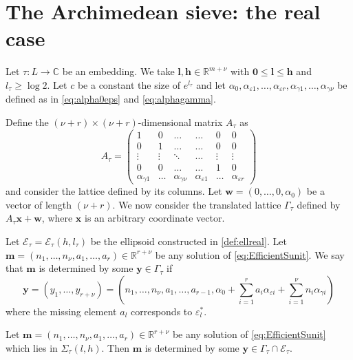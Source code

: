 \section{The Archimedean sieve: the real case}
\label{sec:archsieve}

Let $\tau:L\to\mathbb{C}$ be an embedding. We take $\mathbf{l},\mathbf{h} \in \mathbb{R}^{m+\nu}$ with $\mathbf{0}\leq \mathbf{l}\leq \mathbf{h}$ and $l_\tau\geq \log 2$. Let $c$ be a constant the size of $e^{l_\tau}$ and let $\alpha_0, \alpha_{\varepsilon 1}, \dots, \alpha_{\varepsilon {r}}, \alpha_{\gamma 1}, \dots, \alpha_{\gamma {\nu}}$ be defined as in \eqref{eq:alpha0eps} and \eqref{eq:alphagamma}. 

Define the $(\nu+r) \times (\nu +r)$-dimensional matrix $A_{\tau}$ as
\[A_{\tau} = \begin{pmatrix}
	1 & 0 & \dots &  \dots & 0 & 0\\ 
	0 & 1	& \dots & \dots & 0 & 0\\
	\vdots & \vdots & \ddots & \dots & \vdots & \vdots \\ 
	0 & 0 & \dots &  \dots & 1 & 0\\ 
	\alpha_{\gamma 1} & \dots &\alpha_{\gamma {\nu}} & \alpha_{\varepsilon 1} & \dots & \alpha_{\varepsilon {r}}
\end{pmatrix}\]
and consider the lattice defined by its columns. Let $\mathbf{w} = (0,\dotsc,0,\alpha_0)$ be a vector of length $(\nu + r)$. We now consider the translated lattice $\Gamma_{\tau}$ defined by $A_{\tau}\mathbf{x} + \mathbf{w}$, where $\mathbf{x}$ is an arbitrary coordinate vector. 
 
Let $\mathcal E_{\tau}=\mathcal E_{\tau}(h,l_{\tau})$ be the ellipsoid constructed in \eqref{def:ellreal}. Let ${\mathbf{m} = (n_1, \dots, n_{\nu}, a_1, \dots, a_r) \in \mathbb{R}^{r + \nu}}$ be any solution of \eqref{eq:EfficientSunit}. We say that $\mathbf{m}$ is determined by some $\mathbf{y} \in \Gamma_{\tau}$ if 
\[\mathbf{y} = (y_1, \dots, y_{r+ \nu}) = \left(n_1, \dots, n_{\nu}, a_1, \dots, a_{r-1}, \alpha_0+\sum_{i = 1}^r a_i \alpha_{\varepsilon i} + \sum_{i = 1}^{\nu} n_i \alpha_{\gamma i}\right)\]
where the missing element $a_{l}$ corresponds to $\varepsilon_l^*$.

\begin{lemma}\label{lem:archsieve}
Let ${\mathbf{m} = (n_1, \dots, n_{\nu}, a_1, \dots, a_r) \in \mathbb{R}^{r + \nu}}$ be any solution of \eqref{eq:EfficientSunit} which lies in $\Sigma_\tau(l,h)$. Then $\mathbf{m}$ is determined by some $\mathbf{y}\in \Gamma_\tau\cap\mathcal E_\tau.$
\end{lemma}


